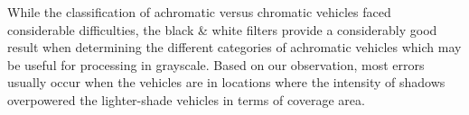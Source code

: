 While the classification of achromatic versus chromatic vehicles faced considerable difficulties, the black \& white filters provide a considerably good result when determining the different categories of achromatic vehicles which may be useful for processing in grayscale. Based on our observation, most errors usually occur when the vehicles are in locations where the intensity of shadows overpowered the lighter-shade vehicles in terms of coverage area. 

\begin{table}[]
\centering
\caption{Confusion matrix for color retrieval task}
\vspace{1.5em}
\label{table:colorMatrix}
\end{table}
